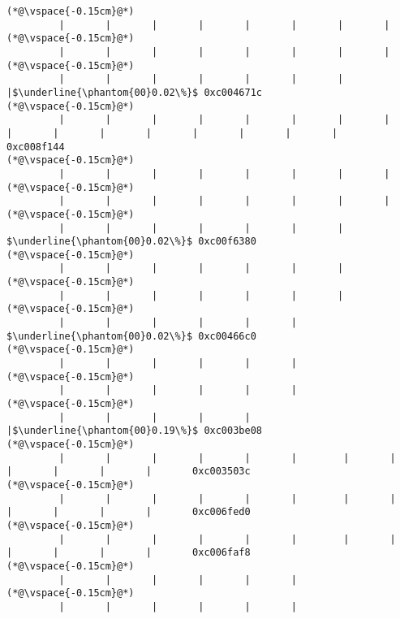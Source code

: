 \begin{lstlisting}[caption=NewDirectByteBuffer, label=profile:C2JNewDirectBuffer-512, numberbychapter=true, frame=lines, float, floatplacement=t]
(*@\vspace{-0.15cm}@*)
         |       |       |       |       |       |       |       |
(*@\vspace{-0.15cm}@*)
         |       |       |       |       |       |       |       |
(*@\vspace{-0.15cm}@*)
         |       |       |       |       |       |       |       |$\underline{\phantom{00}0.02\%}$ 0xc004671c
(*@\vspace{-0.15cm}@*)
         |       |       |       |       |       |       |       |        |       |       |       |       |       |       |       |       0xc008f144
(*@\vspace{-0.15cm}@*)
         |       |       |       |       |       |       |       |
(*@\vspace{-0.15cm}@*)
         |       |       |       |       |       |       |       |
(*@\vspace{-0.15cm}@*)
         |       |       |       |       |       |       |        $\underline{\phantom{00}0.02\%}$ 0xc00f6380
(*@\vspace{-0.15cm}@*)
         |       |       |       |       |       |       |
(*@\vspace{-0.15cm}@*)
         |       |       |       |       |       |       |
(*@\vspace{-0.15cm}@*)
         |       |       |       |       |       |        $\underline{\phantom{00}0.02\%}$ 0xc00466c0
(*@\vspace{-0.15cm}@*)
         |       |       |       |       |       |
(*@\vspace{-0.15cm}@*)
         |       |       |       |       |       |
(*@\vspace{-0.15cm}@*)
         |       |       |       |       |       |$\underline{\phantom{00}0.19\%}$ 0xc003be08
(*@\vspace{-0.15cm}@*)
         |       |       |       |       |       |        |       |       |       |       |       |       0xc003503c
(*@\vspace{-0.15cm}@*)
         |       |       |       |       |       |        |       |       |       |       |       |       0xc006fed0
(*@\vspace{-0.15cm}@*)
         |       |       |       |       |       |        |       |       |       |       |       |       0xc006faf8
(*@\vspace{-0.15cm}@*)
         |       |       |       |       |       |
(*@\vspace{-0.15cm}@*)
         |       |       |       |       |       |

\end{lstlisting}
